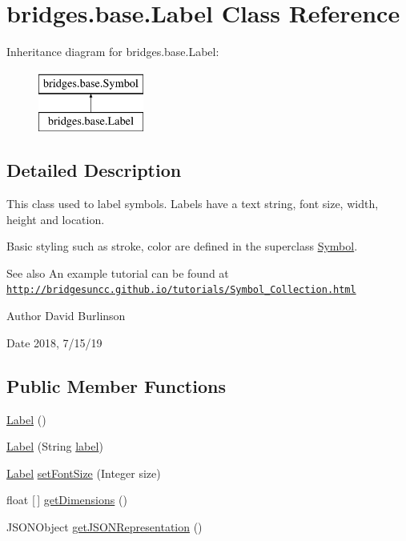 \hypertarget{classbridges_1_1base_1_1_label}{}\section{bridges.\+base.\+Label Class Reference}
\label{classbridges_1_1base_1_1_label}
Inheritance diagram for bridges.\+base.\+Label\+:\begin{figure}[H]
\begin{center}
\leavevmode
\includegraphics[height=2.000000cm]{classbridges_1_1base_1_1_label}
\end{center}
\end{figure}


\subsection{Detailed Description}
This class used to label symbols. Labels have a text string, font size, width, height and location. 

Basic styling such as stroke, color are defined in the superclass \hyperlink{classbridges_1_1base_1_1_symbol}{Symbol}.

\begin{DoxySeeAlso}{See also}
An example tutorial can be found at \href{http://bridgesuncc.github.io/tutorials/Symbol_Collection.html}{\tt http\+://bridgesuncc.\+github.\+io/tutorials/\+Symbol\+\_\+\+Collection.\+html}
\end{DoxySeeAlso}
\begin{DoxyAuthor}{Author}
David Burlinson 
\end{DoxyAuthor}
\begin{DoxyDate}{Date}
2018, 7/15/19 
\end{DoxyDate}
\subsection*{Public Member Functions}
\begin{DoxyCompactItemize}
\item 
\hyperlink{classbridges_1_1base_1_1_label_adaed1c29dc02eb0f77d772b256b9eae4}{Label} ()
\item 
\hyperlink{classbridges_1_1base_1_1_label_a0ffb2cdafae3f2c21e0925f2fe23df87}{Label} (String \hyperlink{classbridges_1_1base_1_1_symbol_ad2adcc82e6a96c2f3c465702502655e9}{label})
\item 
\hyperlink{classbridges_1_1base_1_1_label}{Label} \hyperlink{classbridges_1_1base_1_1_label_ab5f2d60e519db2499f326c4ccb967b25}{set\+Font\+Size} (Integer size)
\item 
float \mbox{[}$\,$\mbox{]} \hyperlink{classbridges_1_1base_1_1_label_a476a68af051d561b805babc1d397b031}{get\+Dimensions} ()
\item 
J\+S\+O\+N\+Object \hyperlink{classbridges_1_1base_1_1_label_a6befc6655ce36868213be289571c6315}{get\+J\+S\+O\+N\+Representation} ()
\end{DoxyCompactItemize}
